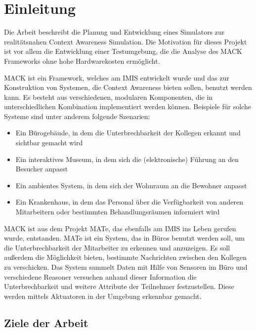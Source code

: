 \chapter{Einleitung}\label{chapter:introduction}


Die Arbeit beschreibt die Planung und Entwicklung eines Simulators zur realitätsnahen Context Awareness Simulation. Die Motivation für dieses Projekt ist vor allem die Entwicklung einer Testumgebung, die die Analyse des MACK Frameworks ohne hohe Hardwarekosten ermöglicht.

MACK ist ein Framework, welches am IMIS entwickelt wurde und das zur Konstruktion von Systemen, die Context Awareness bieten sollen, benutzt werden kann. Es besteht aus verschiedenen, modularen Komponenten, die in unterschiedlichen Kombination implementiert werden können. Beispiele für solche Systeme sind unter anderem folgende Szenarien:
\begin{itemize}
\item Ein Bürogebäude, in dem die Unterbrechbarkeit der Kollegen erkannt und sichtbar gemacht wird
\item Ein interaktives Museum, in dem sich die (elektronische) Führung an den Besucher anpasst
\item Ein ambientes System, in dem sich der Wohnraum an die Bewohner anpasst
\item Ein Krankenhaus, in dem das Personal über die Verfügbarkeit von anderen Mitarbeitern oder bestimmten Behandlungsräumen informiert wird
\end{itemize}
MACK ist aus dem Projekt MATe, das ebenfalls am IMIS ins Leben gerufen wurde, entstanden. MATe ist ein System, das in Büros benutzt werden soll, um die Unterbrechbarkeit der Mitarbeiter zu erkennen und anzuzeigen. Es soll außerdem die Möglichkeit bieten, bestimmte Nachrichten zwischen den Kollegen zu verschicken. Das System sammelt Daten mit Hilfe von Sensoren im Büro und verschiedene Reasoner versuchen anhand dieser Information die Unterbrechbarkeit und weitere Attribute der Teilnehmer festzustellen. Diese werden mittels Aktuatoren in der Umgebung erkennbar gemacht.

\section{Ziele der Arbeit}\label{sec:goals}

